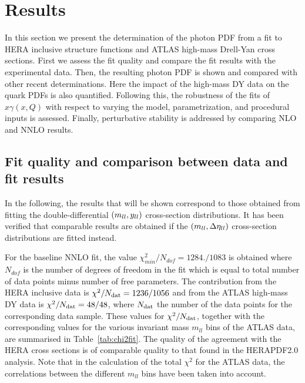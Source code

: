 \section{Results}
\label{sec:results}

In this section we present the
determination of the photon PDF from a fit to 
HERA inclusive structure functions and ATLAS high-mass Drell-Yan cross sections.
%
First we assess the fit quality and compare the fit results
with the experimental data.
%
Then, the resulting photon PDF is shown and compared with other
recent determinations.
%
Here the impact of the high-mass DY data on
the quark PDFs is also quantified.
%
Following this,
the robustness of the fits of $x\gamma(x,Q)$
with respect to varying the model, parametrization, and procedural
inputs is assessed.
%
Finally, perturbative stability is addressed by comparing NLO and
NNLO results.

\subsection{Fit quality and comparison between data and fit results}

In the following, the results that will be shown
correspond to those obtained from fitting the
double-differential $\left( m_{ll},y_{ll}\right)$ cross-section distributions.
%
It has been verified that comparable results are obtained if the
$\left( m_{ll},\Delta\eta_{ll}\right)$ cross-section distributions are fitted instead.

For the baseline NNLO fit, the value $\chi^2_{min}/N_{dof} =
1284./1083$ is obtained where $N_{dof}$ is the number of degrees of
freedom in the fit which is equal to total number of data points minus
number of free parameters.
%
The contribution from the HERA inclusive  data is 
$\chi^{2}/N_{\rm dat} = 1236/1056$ and
from the ATLAS high-mass DY data is $\chi^2/N_{\rm dat} = 48/48$,
where  $N_{\rm dat}$ the number of the data points for the corresponding
data sample.
%
These values for  $\chi^{2}/N_{\rm dat}$, together
with the corresponding values for the various
invariant mass $m_{ll}$ bins of the ATLAS  data,
are summarised in
Table~\ref{tab:chi2fit}.
%
The quality of the agreement with the HERA cross sections is of comparable quality to that found in the HERAPDF2.0 analysis.
%
Note that in the calculation of the total $\chi^2$ for the
ATLAS data, the correlations between the
different $m_{ll}$ bins have been taken into account.

